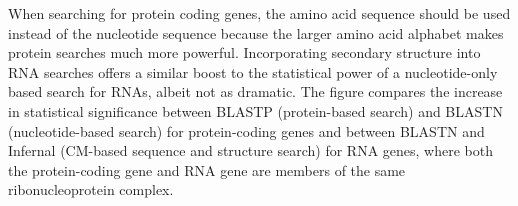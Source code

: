 \documentclass[custom,landscape,final,30pt,plainboxedsections]{sciposter-titleskipsmall}
\begin{document}
\begin{multicols}{3}
When searching for protein coding genes, the amino acid sequence
should be used instead of the nucleotide sequence because the larger
amino acid alphabet makes protein searches much more powerful. 
Incorporating secondary structure into RNA searches offers a similar
boost to the statistical power of a nucleotide-only based search for
RNAs, albeit not as dramatic. The figure compares the increase in
statistical significance between BLASTP (protein-based search) and
BLASTN (nucleotide-based search) for protein-coding
genes and between BLASTN and Infernal (CM-based sequence and structure
search) for RNA genes, where both the protein-coding gene and RNA gene
are members of the same ribonucleoprotein complex. 

\setcounter{figure}{1}



\end{multicols}
\end{document}
